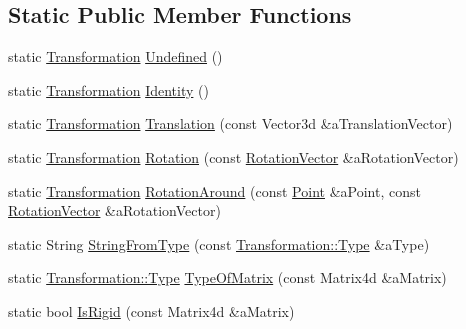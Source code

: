 \subsection*{Static Public Member Functions}
\begin{DoxyCompactItemize}
\item 
static \hyperlink{classlibrary_1_1math_1_1geom_1_1d3_1_1_transformation}{Transformation} \hyperlink{classlibrary_1_1math_1_1geom_1_1d3_1_1_transformation_acb7375bde02ed5832d5937908bee7043}{Undefined} ()
\item 
static \hyperlink{classlibrary_1_1math_1_1geom_1_1d3_1_1_transformation}{Transformation} \hyperlink{classlibrary_1_1math_1_1geom_1_1d3_1_1_transformation_a8d5af972dbba51f5746f2248f5164b69}{Identity} ()
\item 
static \hyperlink{classlibrary_1_1math_1_1geom_1_1d3_1_1_transformation}{Transformation} \hyperlink{classlibrary_1_1math_1_1geom_1_1d3_1_1_transformation_a5f781ba4e25ce79a02afccbe94a1ab0a}{Translation} (const Vector3d \&a\+Translation\+Vector)
\item 
static \hyperlink{classlibrary_1_1math_1_1geom_1_1d3_1_1_transformation}{Transformation} \hyperlink{classlibrary_1_1math_1_1geom_1_1d3_1_1_transformation_a79978a6efb749a2e058aa0b2cea092b2}{Rotation} (const \hyperlink{classlibrary_1_1math_1_1geom_1_1d3_1_1trf_1_1rot_1_1_rotation_vector}{Rotation\+Vector} \&a\+Rotation\+Vector)
\item 
static \hyperlink{classlibrary_1_1math_1_1geom_1_1d3_1_1_transformation}{Transformation} \hyperlink{classlibrary_1_1math_1_1geom_1_1d3_1_1_transformation_a11d93f665adb24cc4fdf2244c8509082}{Rotation\+Around} (const \hyperlink{classlibrary_1_1math_1_1geom_1_1d3_1_1objects_1_1_point}{Point} \&a\+Point, const \hyperlink{classlibrary_1_1math_1_1geom_1_1d3_1_1trf_1_1rot_1_1_rotation_vector}{Rotation\+Vector} \&a\+Rotation\+Vector)
\item 
static String \hyperlink{classlibrary_1_1math_1_1geom_1_1d3_1_1_transformation_a9511c7844b5b8af0c8c7ad97454a5a96}{String\+From\+Type} (const \hyperlink{classlibrary_1_1math_1_1geom_1_1d3_1_1_transformation_a25f1dc99d391174bf82a7132d08b2fc1}{Transformation\+::\+Type} \&a\+Type)
\item 
static \hyperlink{classlibrary_1_1math_1_1geom_1_1d3_1_1_transformation_a25f1dc99d391174bf82a7132d08b2fc1}{Transformation\+::\+Type} \hyperlink{classlibrary_1_1math_1_1geom_1_1d3_1_1_transformation_aa532f2c9f56ee5aff63417283a930584}{Type\+Of\+Matrix} (const Matrix4d \&a\+Matrix)
\item 
static bool \hyperlink{classlibrary_1_1math_1_1geom_1_1d3_1_1_transformation_aa37987be864c3bf60167721c5c41eabc}{Is\+Rigid} (const Matrix4d \&a\+Matrix)
\end{DoxyCompactItemize}

